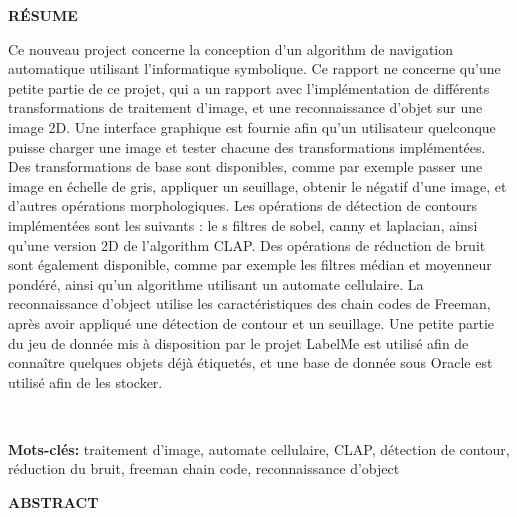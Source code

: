 
\thispagestyle{empty}

\vfill

\begin{center}
	\LARGE{\textbf{RÉSUME}}\\[1.0cm]
\end{center}


\large{ 
Ce nouveau project concerne la conception d'un algorithm de navigation automatique utilisant l'informatique symbolique. Ce rapport ne concerne qu'une petite partie de ce projet, qui a un rapport avec l'implémentation de différents transformations de traitement d'image, et une reconnaissance d'objet sur une image 2D. Une interface graphique est fournie afin qu'un utilisateur quelconque puisse charger une image et tester chacune des transformations implémentées. Des transformations de base sont disponibles, comme par exemple passer une image en échelle de gris, appliquer un seuillage, obtenir le négatif d'une image, et d'autres opérations morphologiques. Les opérations de détection de contours implémentées sont les suivants : le s filtres de sobel, canny et laplacian, ainsi qu'une version 2D de l'algorithm CLAP. Des opérations de réduction de bruit sont également disponible, comme par exemple les filtres médian et moyenneur pondéré, ainsi qu'un algorithme utilisant un automate cellulaire. La reconnaissance d'object utilise les caractéristiques des chain codes de Freeman, après avoir appliqué une détection de contour et un seuillage. Une petite partie du jeu de donnée mis à disposition par le projet LabelMe est utilisé afin de connaître quelques objets déjà étiquetés, et une base de donnée sous Oracle est utilisé afin de les stocker.
}

~~

\textbf{Mots-clés: } traitement d'image, automate cellulaire, CLAP, détection de contour, réduction du bruit, freeman chain code, reconnaissance d'object


\vfill


\begin{center}
	\LARGE{\textbf{ABSTRACT}}\\[1.0cm]
\end{center}


